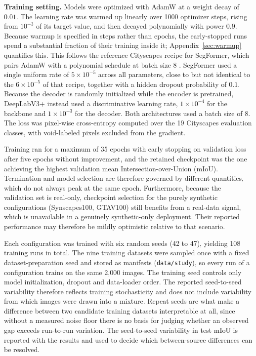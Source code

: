 \documentclass[conference]{IEEEtran}
\begin{document}
\textbf{Training setting.} Models were optimized with AdamW at a weight decay of $0.01$. The learning rate was warmed up linearly over 1000 optimizer steps, rising from $10^{-3}$ of its target value, and then decayed polynomially with power $0.9$. Because warmup is specified in steps rather than epochs, the early-stopped runs spend a substantial fraction of their training inside it; Appendix~\ref{sec:warmup} quantifies this. This follows the reference Cityscapes recipe for SegFormer, which pairs AdamW with a polynomial schedule at batch size 8 \cite{xie2021segformer}. SegFormer used a single uniform rate of $5 \times 10^{-5}$ across all parameters, close to but not identical to the $6 \times 10^{-5}$ of that recipe, together with a hidden dropout probability of $0.1$. Because the decoder is randomly initialized while the encoder is pretrained, DeepLabV3+ instead used a discriminative learning rate, $1 \times 10^{-4}$ for the backbone and $1 \times 10^{-3}$ for the decoder. Both architectures used a batch size of $8$. The loss was pixel-wise cross-entropy computed over the 19 Cityscapes evaluation classes, with void-labeled pixels excluded from the gradient.

Training ran for a maximum of 35 epochs with early stopping on validation loss after five epochs without improvement, and the retained checkpoint was the one achieving the highest validation mean Intersection-over-Union (mIoU). Termination and model selection are therefore governed by different quantities, which do not always peak at the same epoch. Furthermore, because the validation set is real-only, checkpoint selection for the purely synthetic configurations (Synscapes100, GTAV100) still benefits from a real-data signal, which is unavailable in a genuinely synthetic-only deployment. Their reported performance may therefore be mildly optimistic relative to that scenario.

Each configuration was trained with six random seeds (42 to 47), yielding 108 training runs in total. The nine training datasets were sampled once with a fixed dataset-preparation seed and stored as manifests (\texttt{data/study}), so every run of a configuration trains on the same 2{,}000 images. The training seed controls only model initialization, dropout and data-loader order. The reported seed-to-seed variability therefore reflects training stochasticity and does not include variability from which images were drawn into a mixture. Repeat seeds are what make a difference between two candidate training datasets interpretable at all, since without a measured noise floor there is no basis for judging whether an observed gap exceeds run-to-run variation. The seed-to-seed variability in test mIoU is reported with the results and used to decide which between-source differences can be resolved.
\end{document}
